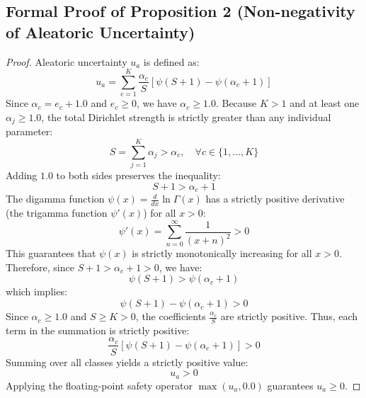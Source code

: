 \documentclass[letterpaper]{article} %
\begin{document}
\subsection{Formal Proof of Proposition 2 (Non-negativity of Aleatoric Uncertainty)}
\begin{proof}
Aleatoric uncertainty $u_a$ is defined as:
\begin{equation}
    u_a = \sum_{c=1}^K \frac{\alpha_c}{S} \left[ \psi(S + 1) - \psi(\alpha_c + 1) \right]
\end{equation}
Since $\alpha_c = e_c + 1.0$ and $e_c \ge 0$, we have $\alpha_c \ge 1.0$. Because $K > 1$ and at least one $\alpha_j \ge 1.0$, the total Dirichlet strength is strictly greater than any individual parameter:
\begin{equation}
    S = \sum_{j=1}^K \alpha_j > \alpha_c, \quad \forall c \in \{1, \dots, K\}
\end{equation}
Adding $1.0$ to both sides preserves the inequality:
\begin{equation}
    S + 1 > \alpha_c + 1
\end{equation}
The digamma function $\psi(x) = \frac{d}{dx} \ln \Gamma(x)$ has a strictly positive derivative (the trigamma function $\psi'(x)$) for all $x > 0$:
\begin{equation}
    \psi'(x) = \sum_{n=0}^{\infty} \frac{1}{(x + n)^2} > 0
\end{equation}
This guarantees that $\psi(x)$ is strictly monotonically increasing for all $x > 0$. Therefore, since $S + 1 > \alpha_c + 1 > 0$, we have:
\begin{equation}
    \psi(S + 1) > \psi(\alpha_c + 1)
\end{equation}
which implies:
\begin{equation}
    \psi(S + 1) - \psi(\alpha_c + 1) > 0
\end{equation}
Since $\alpha_c \ge 1.0$ and $S \ge K > 0$, the coefficients $\frac{\alpha_c}{S}$ are strictly positive. Thus, each term in the summation is strictly positive:
\begin{equation}
    \frac{\alpha_c}{S} \left[ \psi(S + 1) - \psi(\alpha_c + 1) \right] > 0
\end{equation}
Summing over all classes yields a strictly positive value:
\begin{equation}
    u_a > 0
\end{equation}
Applying the floating-point safety operator $\max(u_a, 0.0)$ guarantees $u_a \ge 0$.
\end{proof}
\end{document}
